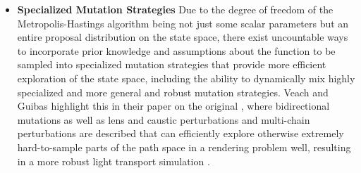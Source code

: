 \documentclass[oneside, a4paper]{article}
\begin{document}
\begin{itemize}
  \item \textbf{Specialized Mutation Strategies} Due to the degree of freedom of the Metropolis-Hastings algorithm being not just some scalar parameters but an entire proposal distribution on the state space, there exist uncountable ways to incorporate prior knowledge and assumptions about the function to be sampled into specialized mutation strategies that provide more efficient exploration of the state space, including the ability to dynamically mix highly specialized and more general and robust mutation strategies. Veach and Guibas highlight this in their paper on the original \autocite[Metropolis Light Transport algorithm]{veach-guibas-mlt}, where bidirectional mutations as well as lens and caustic perturbations and multi-chain perturbations are described that can efficiently explore otherwise extremely hard-to-sample parts of the path space in a rendering problem well, resulting in a more robust light transport simulation \autocite{veach-guibas-mlt}.
\end{itemize}
\end{document}
